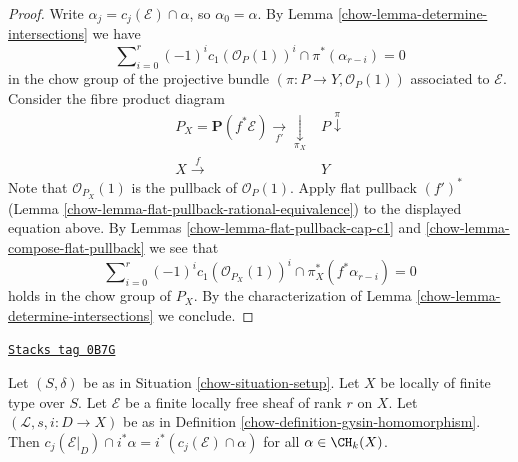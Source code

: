\begin{proof}

Write $\alpha_j = c_j(\mathcal{E}) \cap \alpha$, so $\alpha_0 = \alpha$.
By Lemma \ref{chow-lemma-determine-intersections} we have
$$
\sum\nolimits_{i = 0}^r
(-1)^i c_1(\mathcal{O}_P(1))^i \cap
\pi^*(\alpha_{r - i}) = 0
$$
in the chow group of the projective bundle
$(\pi : P \to Y, \mathcal{O}_P(1))$
associated to $\mathcal{E}$. Consider the fibre product diagram
$$
\begin{array}{cc}P_X = \mathbf{P}(f^*\mathcal{E}) \underset{f'}{\longrightarrow}\underset{\pi_X}{\downarrow} & P \overset{\pi}{\downarrow} \\ X \overset{f}{\longrightarrow} & Y\end{array}
$$
Note that $\mathcal{O}_{P_X}(1)$ is the pullback of $\mathcal{O}_P(1)$.
Apply flat pullback $(f')^*$
(Lemma \ref{chow-lemma-flat-pullback-rational-equivalence}) to the displayed
equation above. By Lemmas \ref{chow-lemma-flat-pullback-cap-c1} and
\ref{chow-lemma-compose-flat-pullback} we see that
$$
\sum\nolimits_{i = 0}^r
(-1)^i c_1(\mathcal{O}_{P_X}(1))^i \cap
\pi_X^*(f^*\alpha_{r - i}) = 0
$$
holds in the chow group of $P_X$. By the characterization of
Lemma \ref{chow-lemma-determine-intersections} we conclude.
\end{proof}

\begin{lemma}
\label{chow-lemma-cap-chern-class-commutes-with-gysin}
\href{https://stacks.math.columbia.edu/tag/0B7G}{\texttt{Stacks tag 0B7G}}

Let $(S, \delta)$ be as in Situation \ref{chow-situation-setup}.
Let $X$ be locally of finite type over $S$.
Let $\mathcal{E}$ be a finite locally free sheaf of rank $r$ on $X$.
Let $(\mathcal{L}, s, i : D \to X)$ be as in
Definition \ref{chow-definition-gysin-homomorphism}.
Then $c_j(\mathcal{E}|_D) \cap i^*\alpha = i^*(c_j(\mathcal{E}) \cap \alpha)$
for all $\alpha \in \CH_k(X)$.
\end{lemma}

